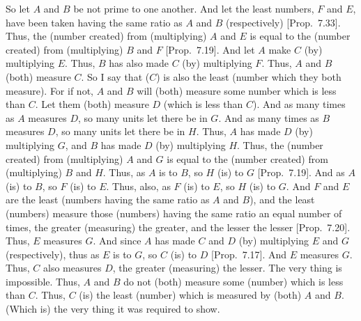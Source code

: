 \begin{Parallel}{}{}
{So let $A$ and $B$ be not prime to one another. And let the least numbers,
$F$ and $E$, have been taken having the same ratio as $A$ and $B$ (respectively)
[Prop.~7.33]. Thus, the (number created)
from (multiplying) $A$ and $E$ is equal to the (number created) from (multiplying) $B$ and $F$ [Prop.~7.19].
And let $A$ make $C$ (by) multiplying $E$. Thus, $B$ has also made $C$
(by) multiplying $F$. Thus, $A$ and $B$ (both) measure $C$. So I say that
($C$) is also the least (number which they both measure). For if not, 
$A$ and $B$ will (both) measure some number which is less than $C$. Let them
(both) measure $D$ 
(which is less than $C$). And as many times as $A$ measures $D$, so many units
let there be in $G$.
And as many times as $B$ measures $D$,
so many units let there be in $H$. Thus, $A$ has made $D$ (by) multiplying $G$, and $B$
has made $D$ (by) multiplying $H$. Thus, the (number created) from (multiplying) $A$ and $G$ is equal to the (number created)
from (multiplying) $B$ and $H$. Thus, as $A$ is to $B$, so $H$ (is) to $G$ [Prop.~7.19]. And as $A$ (is) to $B$, so $F$ (is) to $E$.
Thus, also, as $F$ (is) to $E$, so $H$ (is) to $G$. And $F$ and $E$ are the least
(numbers having the same ratio as $A$ and $B$), and the least (numbers) measure
those (numbers) having the same ratio an equal number of times, the
greater (measuring) the greater, and the lesser the lesser [Prop.~7.20]. Thus, $E$ measures $G$. And since $A$
has made $C$ and $D$ (by) multiplying $E$ and $G$ (respectively), thus as
$E$ is to $G$, so $C$ (is) to $D$ [Prop.~7.17].
And $E$ measures $G$. Thus, $C$ also measures $D$, the greater (measuring) the
lesser. The very thing is impossible. Thus, $A$ and $B$ do not (both) measure some (number) which is less than $C$. Thus, $C$ (is) the least (number) which is measured by (both) $A$
and $B$. (Which is) the very thing it was required to show.}
\end{Parallel}

